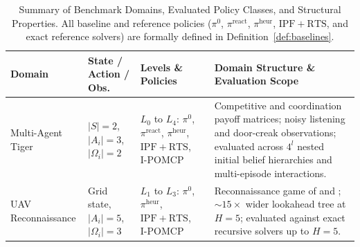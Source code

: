 \begin{table}[t]
  \caption{Summary of Benchmark Domains, Evaluated Policy Classes, and Structural Properties. All baseline and reference policies ($\pi^0$, $\pi^{\mathrm{react}}$, $\pi^{\mathrm{heur}}$, $\mathrm{IPF+RTS}$, and exact reference solvers) are formally defined in Definition~\ref{def:baselines}.}
  \label{tab:domains}
  \centering
  \small
  \begin{tabularx}{\textwidth}{>{\raggedright\arraybackslash}p{} >{\raggedright\arraybackslash}p{} >{\raggedright\arraybackslash}p{} >{\raggedright\arraybackslash}X}
    \toprule
    \textbf{Domain} & \textbf{State / Action / Obs.} & \textbf{Levels \& Policies} & \textbf{Domain Structure \& Evaluation Scope} \\
    \midrule
    Multi-Agent Tiger & $|S|=2$, $|A_i|=3$, $|\Omega_i|=2$ & $L_0$ to $L_4$: $\pi^0$, $\pi^{\mathrm{react}}$, $\pi^{\mathrm{heur}}$, $\mathrm{IPF+RTS}$, $\mathrm{I\text{-}POMCP}$ & Competitive and coordination payoff matrices; noisy listening and door-creak observations; evaluated across $4^l$ nested initial belief hierarchies and multi-episode interactions. \\
    \addlinespace[3pt]
    UAV Reconnaissance & Grid state, $|A_i|=5$, $|\Omega_i|=3$ & $L_1$ to $L_3$: $\pi^0$, $\pi^{\mathrm{heur}}$, $\mathrm{IPF+RTS}$, $\mathrm{I\text{-}POMCP}$ & Reconnaissance game of \citet{doshi2009monte} and \citet{zeng2012exploiting}; $\sim 15\times$ wider lookahead tree at $H=5$; evaluated against exact recursive solvers up to $H=5$. \\
    \bottomrule
  \end{tabularx}
\end{table}

